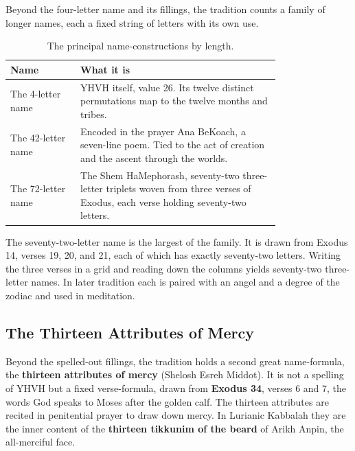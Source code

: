 Beyond the four-letter name and its fillings, the tradition counts a family of
longer names, each a fixed string of letters with its own use.

\begin{longtable}{L{0.20\linewidth} L{0.58\linewidth}}
\caption{The principal name-constructions by length.}\\
\toprule
\textbf{Name} & \textbf{What it is} \\
\midrule
The 4-letter name & YHVH itself, value 26. Its twelve distinct permutations map to the twelve months and tribes. \\
The 42-letter name & Encoded in the prayer Ana BeKoach, a seven-line poem. Tied to the act of creation and the ascent through the worlds. \\
The 72-letter name & The Shem HaMephorash, seventy-two three-letter triplets woven from three verses of Exodus, each verse holding seventy-two letters. \\
\bottomrule
\end{longtable}

The seventy-two-letter name is the largest of the family. It is drawn from Exodus
14, verses 19, 20, and 21, each of which has exactly seventy-two letters. Writing
the three verses in a grid and reading down the columns yields seventy-two
three-letter names. In later tradition each is paired with an angel and a degree
of the zodiac and used in meditation.

\subsection{The Thirteen Attributes of Mercy}

Beyond the spelled-out fillings, the tradition holds a second great name-formula,
the \textbf{thirteen attributes of mercy} (Shelosh Esreh Middot). It is not a
spelling of YHVH but a fixed verse-formula, drawn from \textbf{Exodus 34}, verses
6 and 7, the words God speaks to Moses after the golden calf. The thirteen
attributes are recited in penitential prayer to draw down mercy. In Lurianic
Kabbalah they are the inner content of the \textbf{thirteen tikkunim of the beard}
of Arikh Anpin, the all-merciful face.


